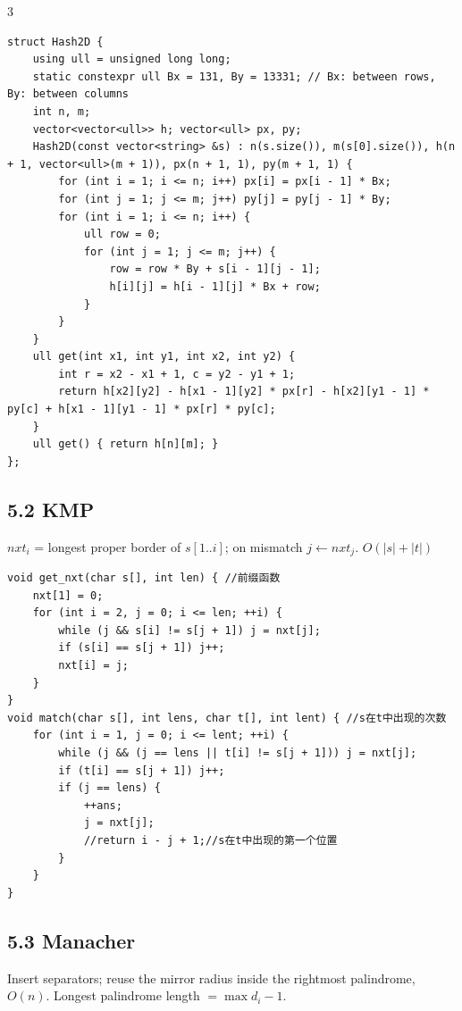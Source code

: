 \documentclass[8pt]{extarticle}
\begin{document}
\begin{multicols*}{3}
\begin{lstlisting}
struct Hash2D {
    using ull = unsigned long long;
    static constexpr ull Bx = 131, By = 13331; // Bx: between rows, By: between columns
    int n, m;
    vector<vector<ull>> h; vector<ull> px, py;
    Hash2D(const vector<string> &s) : n(s.size()), m(s[0].size()), h(n + 1, vector<ull>(m + 1)), px(n + 1, 1), py(m + 1, 1) {
        for (int i = 1; i <= n; i++) px[i] = px[i - 1] * Bx;
        for (int j = 1; j <= m; j++) py[j] = py[j - 1] * By;
        for (int i = 1; i <= n; i++) {
            ull row = 0;
            for (int j = 1; j <= m; j++) {
                row = row * By + s[i - 1][j - 1];
                h[i][j] = h[i - 1][j] * Bx + row;
            }
        }
    }
    ull get(int x1, int y1, int x2, int y2) {
        int r = x2 - x1 + 1, c = y2 - y1 + 1;
        return h[x2][y2] - h[x1 - 1][y2] * px[r] - h[x2][y1 - 1] * py[c] + h[x1 - 1][y1 - 1] * px[r] * py[c];
    }
    ull get() { return h[n][m]; }
};
\end{lstlisting}

\subsection*{5.2 KMP}

$nxt_i$ = longest proper border of $s[1..i]$; on mismatch $j \leftarrow nxt_j$. $O(|s| + |t|)$


\begin{lstlisting}
void get_nxt(char s[], int len) { //前缀函数
    nxt[1] = 0;
    for (int i = 2, j = 0; i <= len; ++i) {
        while (j && s[i] != s[j + 1]) j = nxt[j];
        if (s[i] == s[j + 1]) j++;
        nxt[i] = j;
    }
}
void match(char s[], int lens, char t[], int lent) { //s在t中出现的次数
    for (int i = 1, j = 0; i <= lent; ++i) {
        while (j && (j == lens || t[i] != s[j + 1])) j = nxt[j];
        if (t[i] == s[j + 1]) j++;
        if (j == lens) {
            ++ans;
            j = nxt[j];
            //return i - j + 1;//s在t中出现的第一个位置
        }
    }
}
\end{lstlisting}

\subsection*{5.3 Manacher}

Insert separators; reuse the mirror radius inside the rightmost palindrome, $O(n)$. Longest palindrome length $= \max d_i - 1$.



\end{multicols*}
\end{document}
